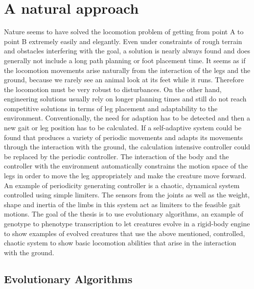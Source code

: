 \documentclass[main]{subfiles}
\begin{document}
\section{A natural approach}

Nature seems to have solved the locomotion problem of getting from point A to point B extremely easily and elegantly. %
%
Even under constraints of rough terrain and obstacles interfering with the goal, a solution is nearly always found and does generally not include a long path planning or foot placement time. %
%
It seems as if the locomotion movements arise naturally from the interaction of the legs and the ground, because we rarely see an animal look at its feet while it runs. %
%
Therefore the locomotion must be very robust to disturbances. %
%
On the other hand, engineering solutions usually rely on longer planning times and still do not reach competitive solutions in terms of leg placement and adaptability to the environment. %
%
Conventionally, the need for adaption has to be detected and then a new gait or leg position has to be calculated. %
%
If a self-adaptive system could be found that produces a variety of periodic movements and adapts its movements through the interaction with the ground, the calculation intensive controller could be replaced by the periodic controller. %
%
The interaction of the body and the controller with the environment automatically constrains the motion space of the legs in order to move the leg appropriately and make the creature move forward. %
%
An example of periodicity generating controller is a chaotic, dynamical system controlled using simple limiters. %
%
The sensors from the joints as well as the weight, shape and inertia of the limbs in this system act as limiters to the feasible gait motions. %
%
The goal of the thesis is to use evolutionary algorithms, an example of genotype to phenotype transcription to let creatures evolve in a rigid-body engine to show examples of evolved creatures that use the above mentioned, controlled, chaotic system to show basic locomotion abilities that arise in the interaction with the ground. %

\subsection{Evolutionary Algorithms}
\end{document}
